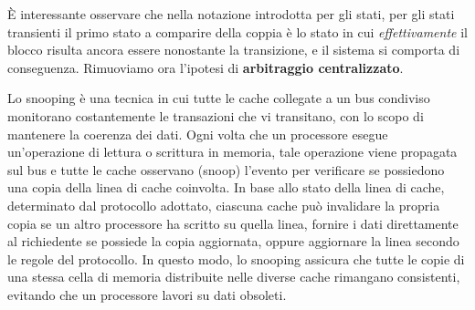 \begin{figure}[ht]
    \centering
    \setlength{\fboxrule}{0.5pt} %
    \setlength{\fboxsep}{0pt}    %
\end{figure}

\noindent \uppercase{è} interessante osservare che nella notazione introdotta per gli stati, per gli stati transienti il primo stato a comparire della coppia è lo stato in cui \textit{effettivamente} il blocco risulta ancora essere nonostante la transizione, e il sistema si comporta di conseguenza. Rimuoviamo ora l'ipotesi di \textbf{arbitraggio centralizzato}. 

\begin{info}
    Lo snooping è una tecnica in cui tutte le cache collegate a un bus condiviso monitorano costantemente le transazioni che vi transitano, con lo scopo di mantenere la coerenza dei dati. Ogni volta che un processore esegue un'operazione di lettura o scrittura in memoria, tale operazione viene propagata sul bus e tutte le cache osservano (snoop) l'evento per verificare se possiedono una copia della linea di cache coinvolta. In base allo stato della linea di cache, determinato dal protocollo adottato, ciascuna cache può invalidare la propria copia se un altro processore ha scritto su quella linea, fornire i dati direttamente al richiedente se possiede la copia aggiornata, oppure aggiornare la linea secondo le regole del protocollo. In questo modo, lo snooping assicura che tutte le copie di una stessa cella di memoria distribuite nelle diverse cache rimangano consistenti, evitando che un processore lavori su dati obsoleti.
\end{info}

